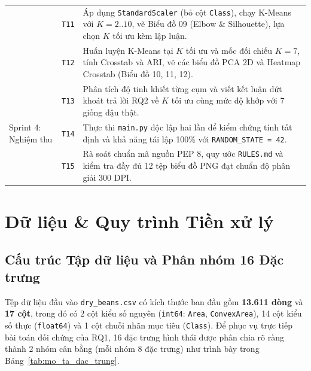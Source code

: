 \documentclass[a4paper,12pt]{report}
\begin{document}
\begin{longtable}{@{}>{\raggedright\arraybackslash}p{3.5cm} c >{\raggedright\arraybackslash}p{10.5cm}@{}}
 & \texttt{T11} & Áp dụng \texttt{StandardScaler} (bỏ cột \texttt{Class}), chạy K-Means với $K = 2..10$, vẽ Biểu đồ 09 (Elbow \& Silhouette), lựa chọn $K$ tối ưu kèm lập luận. \\
 & \texttt{T12} & Huấn luyện K-Means tại $K$ tối ưu và mốc đối chiếu $K = 7$, tính Crosstab và ARI, vẽ các biểu đồ PCA 2D và Heatmap Crosstab (Biểu đồ 10, 11, 12). \\
 & \texttt{T13} & Phân tích độ tinh khiết từng cụm và viết kết luận dứt khoát trả lời RQ2 về $K$ tối ưu cùng mức độ khớp với 7 giống đậu thật. \\
\cmidrule(l){1-3}
Sprint 4: Nghiệm thu & \texttt{T14} & Thực thi \texttt{main.py} độc lập hai lần để kiểm chứng tính tất định và khả năng tái lập 100\% với \texttt{RANDOM\_STATE = 42}. \\
 & \texttt{T15} & Rà soát chuẩn mã nguồn PEP 8, quy ước \texttt{RULES.md} và kiểm tra đầy đủ 12 tệp biểu đồ PNG đạt chuẩn độ phân giải 300 DPI. \\
\end{longtable}

\section{Dữ liệu \& Quy trình Tiền xử lý}

\subsection{Cấu trúc Tập dữ liệu và Phân nhóm 16 Đặc trưng}
Tệp dữ liệu đầu vào \texttt{dry\_beans.csv} có kích thước ban đầu gồm \textbf{13.611 dòng} và \textbf{17 cột}, trong đó có 2 cột kiểu số nguyên (\texttt{int64}: \texttt{Area}, \texttt{ConvexArea}), 14 cột kiểu số thực (\texttt{float64}) và 1 cột chuỗi nhãn mục tiêu (\texttt{Class}). Để phục vụ trực tiếp bài toán đối chứng của RQ1, 16 đặc trưng hình thái được phân chia rõ ràng thành 2 nhóm cân bằng (mỗi nhóm 8 đặc trưng) như trình bày trong Bảng~\ref{tab:mo_ta_dac_trung}.
\end{document}
